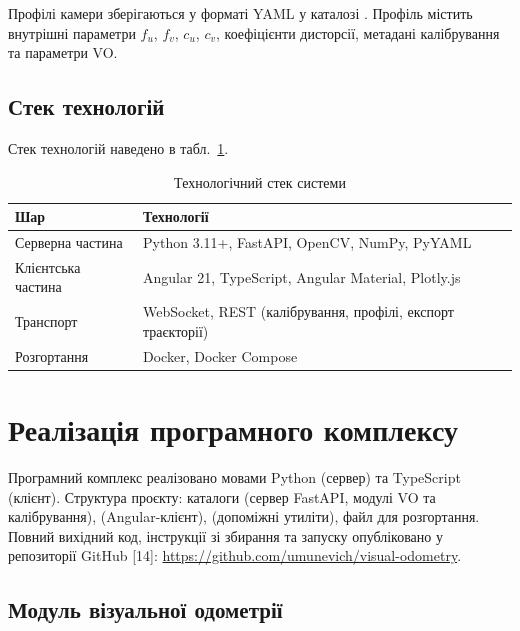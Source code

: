 \documentclass[14pt,a4paper,openany]{extreport}
\begin{document}
Профілі камери зберігаються у форматі YAML у каталозі . Профіль містить внутрішні параметри $f_u$, $f_v$, $c_u$, $c_v$, коефіцієнти дисторсії, метадані калібрування та параметри VO.

\section{Стек технологій}

Стек технологій наведено в табл.~\ref{tab:stack}.

\begin{table}[htbp]
  \caption{Технологічний стек системи}
  \label{tab:stack}
  \centering
  \begin{tabular}{|>{\raggedright\arraybackslash}p{2.7cm}|>{\raggedright\arraybackslash}p{10.3cm}|}
    \hline
    Шар & Технології \\
    \hline
    Серверна частина & Python 3.11+, FastAPI, OpenCV, NumPy, PyYAML \\
    \hline
    Клієнтська частина & Angular 21, TypeScript, Angular Material, Plotly.js \\
    \hline
    Транспорт & WebSocket, REST (калібрування, профілі, експорт траєкторії) \\
    \hline
    Розгортання & Docker, Docker Compose \\
    \hline
  \end{tabular}
\end{table}

\chapter{Реалізація програмного комплексу}

Програмний комплекс реалізовано мовами Python (сервер) та TypeScript (клієнт). Структура проєкту: каталоги  (сервер FastAPI, модулі VO та калібрування),  (Angular-клієнт),  (допоміжні утиліти), файл  для розгортання. Повний вихідний код, інструкції зі збирання та запуску опубліковано у репозиторії GitHub [14]: \url{https://github.com/umunevich/visual-odometry}.

\section{Модуль візуальної одометрії}
\end{document}
